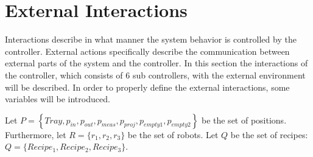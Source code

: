 \section{External Interactions}\label{sec:ext_interactions}
Interactions describe in what manner the system behavior is controlled by the controller.
External actions specifically describe the communication between external parts of the system and the controller.
In this section the interactions of the controller, which consists of $6$ sub controllers, with the external environment will be described.
In order to properly define the external interactions, some variables will be introduced.

Let $P = \left\{\mathit{Tray}, p_\mathit{in}, p_\mathit{out}, p_\mathit{meas}, p_\mathit{proj}, p_\mathit{empty1}, p_\mathit{empty2}\right\}$ be the set of positions.
Furthermore, let $R = \{r_1,r_2,r_3\}$ be the set of robots.
Let $Q$ be the set of recipes: $Q = \{Recipe_1, Recipe_2, Recipe_3\}$.


